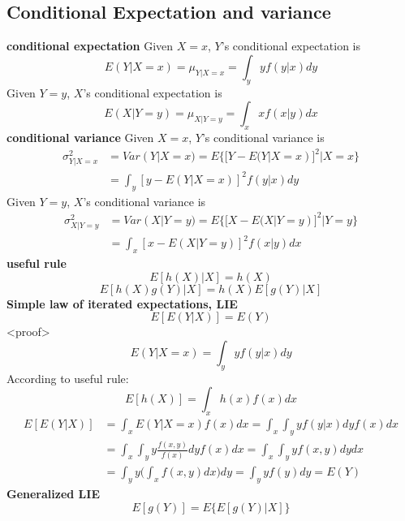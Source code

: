 \documentclass[12pt]{article}
\begin{document}
\subsection*{Conditional Expectation and variance}
\textbf{conditional expectation}
\newline
Given $X=x$, $Y$'s conditional expectation is
\begin{equation}
    E(Y|X=x)=\mu_{Y|X=x}=\int_y yf(y|x)dy
\end{equation}
Given $Y=y$, $X$'s conditional expectation is
\begin{equation}
    E(X|Y=y)=\mu_{X|Y=y}=\int_x xf(x|y)dx
\end{equation}
\textbf{conditional variance}
\newline
Given $X=x$, $Y$'s conditional variance is
\begin{equation}
    \begin{aligned}
        \sigma^2_{Y|X=x}&=Var(Y|X=x)=E\{[Y-E(Y|X=x)]^2|X=x\}\\&=\int_y[y-E(Y|X=x)]^2f(y|x)dy
    \end{aligned}
\end{equation}
Given $Y=y$, $X$'s conditional variance is
\begin{equation}
    \begin{aligned}
        \sigma^2_{X|Y=y}&=Var(X|Y=y)=E\{[X-E(X|Y=y)]^2|Y=y\}\\&=\int_x[x-E(X|Y=y)]^2f(x|y)dx
    \end{aligned}
\end{equation}
\textbf{useful rule}
\begin{equation}
    E[h(X)|X]=h(X)
\end{equation}
\begin{equation}
    E[h(X)g(Y)|X]=h(X)E[g(Y)|X]
\end{equation}
\textbf{Simple law of iterated expectations, LIE}
\begin{equation}
    E[E(Y|X)]=E(Y)
\end{equation}
<proof>
    \[E(Y|X=x)=\int_y yf(y|x)dy\]
According to useful rule:
    \[E[h(X)]=\int_x h(x)f(x)dx\]
\begin{equation*}
    \begin{aligned}
        E[E(Y|X)] &=\int_x E(Y|X=x)f(x)dx = \int_x \int_y yf(y|x)dyf(x)dx \\
        &= \int_x\int_y y\frac{f(x,y)}{f(x)}dyf(x)dx = \int_x \int_y yf(x,y)dydx \\
        &= \int_y y\Big(\int_x f(x,y)dx\Big)dy = \int_y yf(y)dy = E(Y)
    \end{aligned}
\end{equation*}
\textbf{Generalized LIE}
\begin{equation}
    E[g(Y)]=E\{E[g(Y)|X]\}
\end{equation}
\end{document}
